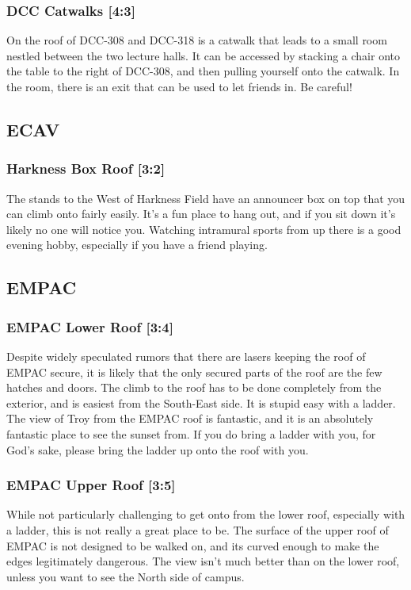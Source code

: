 \documentclass{article}
\begin{document}
\subsubsection{DCC Catwalks [4:3]}
On the roof of DCC-308 and DCC-318 is a catwalk that leads to a small room nestled between the two lecture halls. It can be accessed by stacking a chair onto the table to the right of DCC-308, and then pulling yourself onto the catwalk. In the room, there is an exit that can be used to let friends in. Be careful!

\pagebreak
\subsection{ECAV}
\subsubsection{Harkness Box Roof [3:2]}
The stands to the West of Harkness Field have an announcer box on top that you can climb onto fairly easily. It’s a fun place to hang out, and if you sit down it’s likely no one will notice you. Watching intramural sports from up there is a good evening hobby, especially if you have a friend playing.

\pagebreak
\subsection{EMPAC}
\subsubsection{EMPAC Lower Roof [3:4]}
Despite widely speculated rumors that there are lasers keeping the roof of EMPAC secure, it is likely that the only secured parts of the roof are the few hatches and doors. The climb to the roof has to be done completely from the exterior, and is easiest from the South-East side. It is stupid easy with a ladder. The view of Troy from the EMPAC roof is fantastic, and it is an absolutely fantastic place to see the sunset from. If you do bring a ladder with you, for God’s sake, please bring the ladder up onto the roof with you.
\subsubsection{EMPAC Upper Roof [3:5]}
While not particularly challenging to get onto from the lower roof, especially with a ladder, this is not really a great place to be. The surface of the upper roof of EMPAC is not designed to be walked on, and its curved enough to make the edges legitimately dangerous. The view isn’t much better than on the lower roof, unless you want to see the North side of campus.
\end{document}
